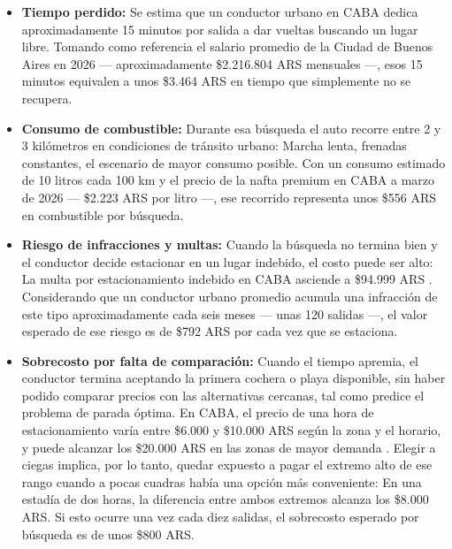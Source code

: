 \begin{itemize}
    \item \textbf{Tiempo perdido:} Se estima que un conductor urbano en CABA dedica aproximadamente 15 minutos por salida a dar vueltas buscando un lugar libre. Tomando como referencia el salario promedio de la Ciudad de Buenos Aires en 2026 --- aproximadamente \$2.216.804 ARS mensuales \autocite{infobae_salarios_2026} ---, esos 15 minutos equivalen a unos \$3.464 ARS en tiempo que simplemente no se recupera.
    \item \textbf{Consumo de combustible:} Durante esa búsqueda el auto recorre entre 2 y 3 kilómetros en condiciones de tránsito urbano: Marcha lenta, frenadas constantes, el escenario de mayor consumo posible. Con un consumo estimado de 10 litros cada 100 km y el precio de la nafta premium en CABA a marzo de 2026 --- \$2.223 ARS por litro \autocite{economista_nafta_2026} ---, ese recorrido representa unos \$556 ARS en combustible por búsqueda.
    \item \textbf{Riesgo de infracciones y multas:} Cuando la búsqueda no termina bien y el conductor decide estacionar en un lugar indebido, el costo puede ser alto: La multa por estacionamiento indebido en CABA asciende a \$94.999 ARS \autocite{infobae_multas_2026}. Considerando que un conductor urbano promedio acumula una infracción de este tipo aproximadamente cada seis meses --- unas 120 salidas ---, el valor esperado de ese riesgo es de \$792 ARS por cada vez que se estaciona.
    \item \textbf{Sobrecosto por falta de comparación:} Cuando el tiempo apremia, el conductor termina aceptando la primera cochera o playa disponible, sin haber podido comparar precios con las alternativas cercanas, tal como predice el problema de parada óptima. En CABA, el precio de una hora de estacionamiento varía entre \$6.000 y \$10.000 ARS según la zona y el horario, y puede alcanzar los \$20.000 ARS en las zonas de mayor demanda \autocite{iprofesional2026cocheras}. Elegir a ciegas implica, por lo tanto, quedar expuesto a pagar el extremo alto de ese rango cuando a pocas cuadras había una opción más conveniente: En una estadía de dos horas, la diferencia entre ambos extremos alcanza los \$8.000 ARS. Si esto ocurre una vez cada diez salidas, el sobrecosto esperado por búsqueda es de unos \$800 ARS.
\end{itemize}

\vspace{0.3cm}


